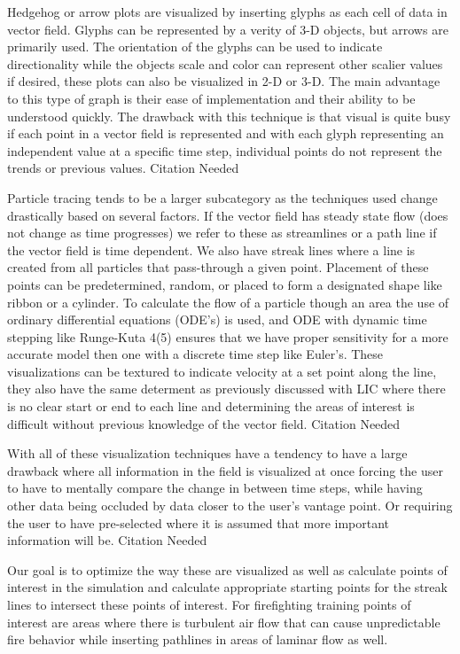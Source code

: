Hedgehog or arrow plots are visualized by inserting glyphs as each cell of data in vector field. Glyphs can be represented by a verity of 3-D objects, but arrows are primarily used. The orientation of the glyphs can be used to indicate directionality while the objects scale and color can represent other scalier values if desired, these plots can also be visualized in 2-D or 3-D. The main advantage to this type of graph is their ease of implementation and their ability to be understood quickly. The drawback with this technique is that visual is quite busy if each point in a vector field is represented and with each glyph representing an independent value at a specific time step, individual points do not represent the trends or previous values.  {Citation Needed}
\par
Particle tracing tends to be a larger subcategory as the techniques used change drastically based on several factors. If the vector field has steady state flow (does not change as time progresses) we refer to these as streamlines or a path line if the vector field is time dependent. We also have streak lines where a line is created from all particles that pass-through a given point. Placement of these points can be predetermined, random, or placed to form a designated shape like ribbon or a cylinder. To calculate the flow of a particle though an area the use of ordinary differential equations (ODE’s) is used, and ODE with dynamic time stepping like Runge-Kuta 4(5) ensures that we have proper sensitivity for a more accurate model then one with a discrete time step like Euler’s. These visualizations can be textured to indicate velocity at a set point along the line, they also have the same determent as previously discussed with LIC where there is no clear start or end to each line and determining the areas of interest is difficult without previous knowledge of the vector field.   {Citation Needed}
\par
With all of these visualization techniques have a tendency to have a large drawback where all information in the field is visualized at once forcing the user to have to mentally compare the change in between time steps, while having other data being occluded by data closer to the user’s vantage point. Or requiring the user to have pre-selected where it is assumed that more important information will be.  {Citation Needed}


Our goal is to optimize the way these are visualized as well as calculate points of interest in the simulation and calculate appropriate starting points for the streak lines to intersect these points of interest. For firefighting training points of interest are areas where there is turbulent air flow that can cause unpredictable fire behavior while inserting pathlines in areas of laminar flow as well.


